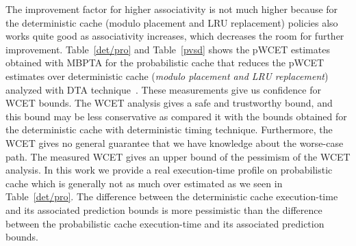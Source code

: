 \begin{table}[tb!]
\caption{Pessimism between Predicted pWCETs at $10^{-3}$ Exceedance Probability versus Deterministic Cache.}
\centering
\label{pvsd}
\end{table}
 
 
 
  The improvement
 factor for higher associativity is not much higher because for the deterministic cache (modulo placement and LRU replacement)  policies
 also works quite good as associativity increases, which decreases the room for
 further improvement. Table~\ref{det/pro} and Table~\ref{pvsd} shows the pWCET
 estimates obtained with MBPTA for the probabilistic cache that reduces the pWCET estimates over deterministic cache (\textit{modulo placement and LRU replacement}) analyzed with DTA technique~\cite{beyls2001reuse}.
 These measurements give us confidence for WCET bounds. The WCET
 analysis gives a safe and trustworthy bound, and this bound may be
 less conservative as compared it with the bounds obtained for the deterministic cache with deterministic timing technique. Furthermore, the WCET gives no general guarantee that we
 have knowledge about the worse-case path. The measured WCET gives an
 upper bound of the pessimism of the WCET analysis. In this work we
 provide a real execution-time profile on probabilistic cache which is generally not as much over
 estimated as we seen in 
 Table~\ref{det/pro}. The difference between the deterministic cache execution-time and its associated prediction bounds is more pessimistic than the difference between the probabilistic cache execution-time and its associated prediction bounds. 
 
